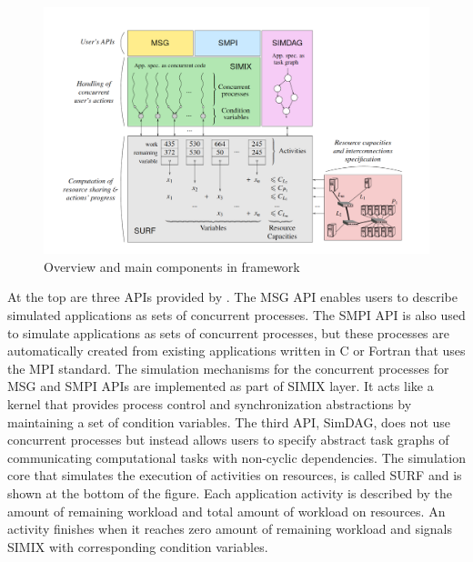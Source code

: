 \begin{figure}[!h]
     \centering
     \includegraphics[width=\linewidth]{figures/simgrid.png}
     \caption{Overview and main components in \simgrid framework }
     \label{fig:simgrid}
\end{figure}

At the top are three APIs provided by \simgrid. 
The MSG API enables users to describe simulated applications as sets of 
concurrent processes. 
The SMPI API is also used to simulate applications as sets of 
concurrent processes, but these processes are automatically created from 
existing applications written in C or Fortran that uses the MPI standard.
The simulation mechanisms for the concurrent processes for MSG and SMPI APIs
are implemented as part of SIMIX layer. It acts like a kernel that provides 
process control and synchronization abstractions by maintaining a set of 
condition variables.
The third API, SimDAG, does not use concurrent processes but instead 
allows users to specify abstract task graphs of communicating computational 
tasks with non-cyclic dependencies.
The simulation core that simulates the execution of activities on resources, 
is called SURF and is shown at the bottom of the figure.
Each application activity is described by the amount of remaining workload 
and total amount of workload on resources.
An activity finishes when it reaches zero amount of remaining workload and 
signals SIMIX with corresponding condition variables. 
 
